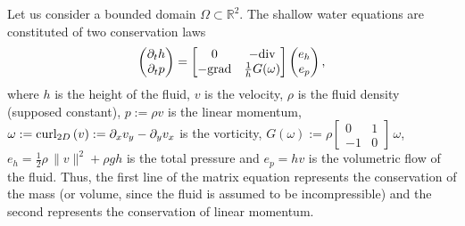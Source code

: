 \documentclass[letterpaper,10pt,english]{sphinxmanual}
\begin{document}
\sphinxAtStartPar
Let us consider a bounded domain \(\Omega \subset \mathbb{R}^2\).
The shallow water equations are constituted of two conservation laws
\begin{equation*}
\begin{split}\begin{pmatrix}
\partial_t h \\ \partial_t p
\end{pmatrix}
= \begin{bmatrix}
0 & - {\rm div} \\
-{\rm grad} & \frac{1}{h} G(\omega)
\end{bmatrix}
\begin{pmatrix}
{e}_h \\ {e_p}
\end{pmatrix} ,\end{split}
\end{equation*}
\sphinxAtStartPar
where \(h\) is the height of the fluid, \(v\) is the velocity,
\(\rho\) is the fluid density (supposed constant),
\(p := \rho v\) is the linear momentum,
\(\omega := {\rm curl}_{2D} \left( v \right) := \partial_x v_y - \partial_y v_x\)
is the vorticity,
\(G(\omega):=\rho \begin{bmatrix} 0 & 1 \\ -1 & 0 \end{bmatrix}\,{\omega}\),
\(e_h = \frac{1}{2} \rho\,\|v\|^2 + \rho g h\) is the total pressure
and \(e_p = h v\) is the volumetric flow of the fluid. Thus, the
first line of the matrix equation represents the conservation of the
mass (or volume, since the fluid is assumed to be incompressible) and
the second represents the conservation of linear momentum.
\end{document}
